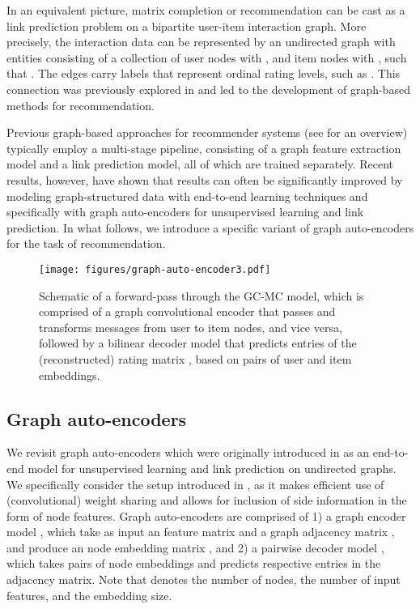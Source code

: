 \documentclass[twoside]{article}
\begin{document}
\newpage
In an equivalent picture, matrix completion or recommendation can be cast as a link prediction problem on a bipartite user-item interaction graph. More precisely, the interaction data can be represented by an undirected graph 
 with entities consisting of a collection of user nodes  with , and item nodes  with , such that . The edges  carry labels that represent ordinal rating levels, such as . This connection was previously explored in \cite{2013_Li_DecisionSupportSystems} and led to the development of graph-based methods for recommendation.

Previous graph-based approaches for recommender systems (see \cite{2013_Li_DecisionSupportSystems} for an overview) typically employ a multi-stage pipeline, consisting of a graph feature extraction model and a link prediction model, all of which are trained separately. Recent results, however, have shown that results can often be significantly improved by modeling graph-structured data with end-to-end learning techniques \cite{bruna2013spectral, duvenaud2015convolutional, li2015gated, niepert2016learning, defferrard2016convolutional, kipf2016semi, monti2016geometric} and specifically with graph auto-encoders \cite{tian2014learning, kipf2016variational} for unsupervised learning and link prediction. In what follows, we introduce a specific variant of graph auto-encoders for the task of recommendation.

\begin{figure*}[ht]
    \centering
    \texttt{[image: figures/graph-auto-encoder3.pdf]}
    \caption{Schematic of a forward-pass through the GC-MC model, which is comprised of a graph convolutional encoder  that passes and transforms messages from user to item nodes, and vice versa, followed by a bilinear decoder model that predicts entries of the (reconstructed) rating matrix , based on pairs of user and item embeddings.}
    \label{fig:gae}
\end{figure*}

\subsection{Graph auto-encoders}
We revisit graph auto-encoders which were originally introduced in \cite{tian2014learning, kipf2016variational} as an end-to-end model for unsupervised learning \cite{tian2014learning} and link prediction \cite{kipf2016variational} on undirected graphs. We specifically consider the setup introduced in \cite{kipf2016variational}, as it makes efficient use of (convolutional) weight sharing and allows for inclusion of side information in the form of node features. Graph auto-encoders are comprised of 1) a graph encoder model , which take as input an  feature matrix  and a graph adjacency matrix , and produce an  node embedding matrix , and 2) a pairwise decoder model , which takes pairs of node embeddings  and predicts respective entries  in the adjacency matrix. Note that  denotes the number of nodes,  the number of input features, and  the embedding size.
\end{document}
